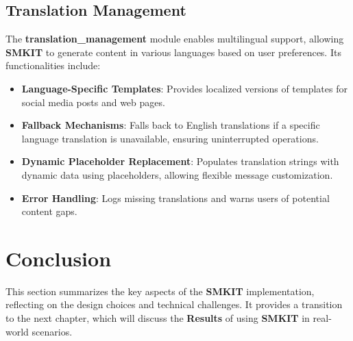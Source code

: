 \subsection{Translation Management}
\label{subsec:translation_management}
The \textbf{translation\_management} module enables multilingual support, allowing \textbf{SMKIT} to generate content in various languages based on user preferences. Its functionalities include:
\begin{itemize}
    \item \textbf{Language-Specific Templates}: Provides localized versions of templates for social media posts and web pages.
    \item \textbf{Fallback Mechanisms}: Falls back to English translations if a specific language translation is unavailable, ensuring uninterrupted operations.
    \item \textbf{Dynamic Placeholder Replacement}: Populates translation strings with dynamic data using placeholders, allowing flexible message customization.
    \item \textbf{Error Handling}: Logs missing translations and warns users of potential content gaps.
\end{itemize}


\section{Conclusion}
\label{sec:implementation_conclusion}
This section summarizes the key aspects of the \textbf{SMKIT} implementation, reflecting on the design choices and technical challenges. It provides a transition to the next chapter, which will discuss the \textbf{Results} of using \textbf{SMKIT} in real-world scenarios.
